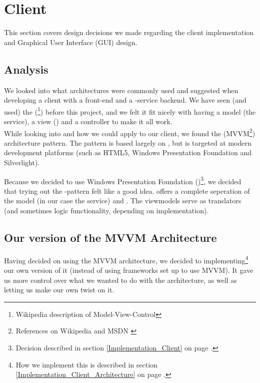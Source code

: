 \section{Client}
\label{Design_Client}
This section covers design decisions we made regarding the client implementation and Graphical User Interface (GUI) design.
\subsection{Analysis}
\label{Design_Client_Analysis}
We looked into what architectures were commonly used and suggested when developing a client with a  front-end and a -service backend. We have seen (and used) the  (\footnote{Wikipedia description of Model-View-Control\cite{WIKI-MVC}}) before this project, and we felt it fit nicely with having a model (the service), a view () and a controller to make it all work. 
\\While looking into  and how we could apply to our client, we found the  (MVVM\footnote{References on Wikipedia \cite{WIKI-MVVM} and MSDN \cite{MSDN-WPF-MVVM}}) architecture pattern. The  pattern is based largely on , but is targeted at modern  development platforms (such as HTML5, Windows Presentation Foundation and Silverlight).

Because we decided to use Windows Presentation Foundation ()\footnote{Decision described in section \ref{Implementation_Client} on page \pageref{Implementation_Client}.}, we decided that trying out the -pattern felt like a good idea.  offers a complete seperation of the model (in our case the  service) and . The viewmodels serve as translators (and sometimes logic functionality, depending on implementation).
\subsection[Architecture]{Our version of the MVVM Architecture}
\label{Design_Client_Architecture}
Having decided on using the MVVM architecture, we decided to implementing\footnote{How we implement this is described in section \ref{Implementation_Client_Architecture} on page \pageref{Implementation_Client_Architecture}.} our own version of it (instead of using frameworks set up to use MVVM). It gave us more control over what we wanted to do with the architecture, as well as letting us make our own twist on it.

